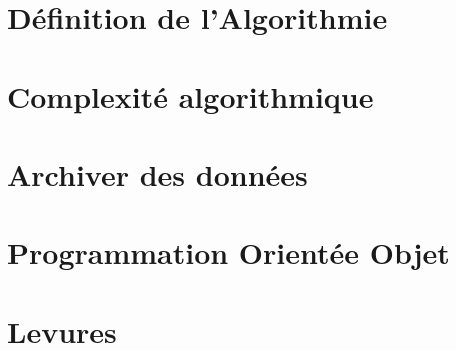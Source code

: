 \documentclass[a4paper,13pt]{report}
\begin{document}
\appendix
\chapter{Définition de l'Algorithmie}

\chapter{Complexité algorithmique}

\chapter{Archiver des données}
	
\chapter{Programmation Orientée Objet}

\chapter{Levures}
	
\end{document}
